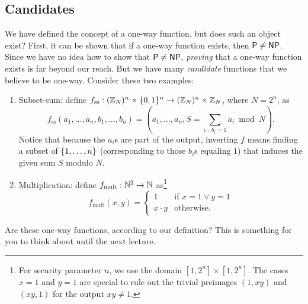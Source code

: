 \documentclass[11pt]{article}
\begin{document}
\subsection{Candidates}
\label{sec:candidates}

We have defined the concept of a one-way function, but does such an
object exist?  First, it can be shown that if a one-way function
exists, then $\mathsf{P} \neq \mathsf{NP}$.  Since we have no idea how to show that
$\mathsf{P} \neq \mathsf{NP}$, \emph{proving} that a one-way function exists is far
beyond our reach.  But we have many \emph{candidate} functions that we
believe to be one-way.  Consider these two examples:
\begin{enumerate}
\item Subset-sum: define $f_{\text{ss}} : (\mathbb{Z}_{N})^{n} \times \{0,1\}^{n}
  \to (\mathbb{Z}_{N})^{n} \times \mathbb{Z}_{N}$, where $N = 2^{n}$, as \[
  f_{\text{ss}}(a_{1}, \ldots, a_{n}, b_{1}, \ldots, b_{n}) = (a_{1},
  \ldots, a_{n}, S = \sum_{i\; :\; b_{i} = 1} a_{i} \bmod N). \]
  Notice that because the $a_{i}$s are part of the output, inverting
  $f$ means finding a subset of $\{1,\ldots,n\}$ (corresponding to
  those $b_{i}$s equaling $1$) that induces the given sum $S$ modulo
  $N$.
\item Multiplication: define $f_{\text{mult}} : \mathbb{N}^{2} \to \mathbb{N}$
  as\footnote{For security parameter $n$, we use the domain $[1,2^{n}]
    \times [1,2^{n}]$.  The cases $x=1$ and $y=1$ are special to rule
    out the trivial preimages $(1,xy)$ and $(xy, 1)$ for the output
    $xy \neq 1$.}
  \[
  f_{\text{mult}}(x,y) =
  \begin{cases}
    1 & \text{if } x=1 \vee y=1 \\
    x \cdot y & \text{otherwise.}
  \end{cases}
  \]
\end{enumerate}

Are these one-way functions, according to our definition?  This is
something for you to think about until the next lecture.
\end{document}
